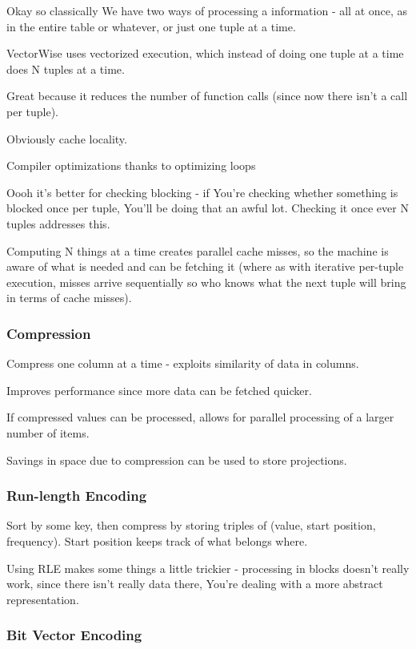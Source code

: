 \documentclass{article}
\begin{document}
			Okay so classically We have two ways of processing a information - all at once, as in the entire table or whatever, or just one tuple at a time.
			
			VectorWise uses vectorized execution, which instead of doing one tuple at a time does N tuples at a time.
			
			Great because it reduces  the number of function calls (since now there isn't a call per tuple).
			
			Obviously cache locality.
			
			Compiler optimizations thanks to optimizing loops
			
			Oooh it's better for checking blocking - if You're checking whether something is blocked once per tuple, You'll be doing that an awful lot. Checking it once ever N tuples addresses this.
			
			Computing N things at a time creates parallel cache misses, so the machine is aware of what is needed and can be fetching it (where as with iterative per-tuple execution, misses arrive sequentially so who knows what the next tuple will bring in terms of cache misses).
			
		\subsubsection{Compression}
			
			Compress one column at a time - exploits similarity of data in columns.
			
			Improves performance since more data can be fetched quicker.
			
			If compressed values can be processed, allows for parallel processing of a larger number of items.
			
			Savings in space due to compression can be used to store projections.
			
		\subsubsection{Run-length Encoding}
		
			Sort by some key, then compress by storing triples of (value, start position, frequency). Start position keeps track of what belongs where.
			
			Using RLE makes some things a little trickier - processing in blocks doesn't really work, since there isn't really data there, You're dealing with a more abstract representation.
			
		\subsubsection{Bit Vector Encoding}
		
\end{document}
